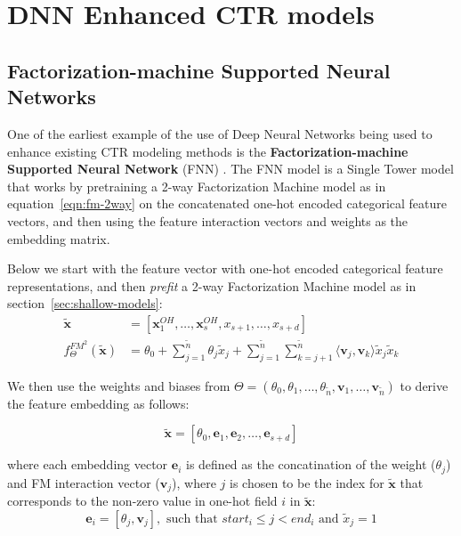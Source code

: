 \documentclass{mldsmsc}
\begin{document}
\section{DNN Enhanced CTR models}
\label{sec:mlp-enhanced-models}

\subsection{Factorization-machine Supported Neural Networks}

One of the earliest example of the use of Deep Neural Networks being used to enhance existing
CTR modeling methods is the \textbf{Factorization-machine Supported Neural Network} (FNN)
\citep{RefWorks:zhang2016deep}. The FNN model is a Single Tower model that works by pretraining
a 2-way Factorization Machine model as in equation~\ref{eqn:fm-2way} on the concatenated
one-hot encoded categorical feature vectors, and then using the feature interaction vectors and
weights as the embedding matrix.

Below we start with the feature vector with one-hot encoded categorical feature representations, and then \emph{prefit}
a 2-way Factorization Machine model as in section~\ref{sec:shallow-models}:
\begin{align*}
    \tilde{\mathbf{x}} &= \left[\mathbf{x}_1^{OH}, \ldots, \mathbf{x}_s^{OH},  x_{s+1}, \ldots, x_{s+d}\right]\\
    f_{\Theta}^{FM^2}(\tilde{\mathbf{x}} ) &= \theta_0 + \sum_{j=1}^{\tilde{n}} \theta_j \tilde{x}_j +
    \sum_{j=1}^{\tilde{n}} \sum_{k=j+1}^{\tilde{n}}
    \langle \mathbf{v}_j, \mathbf{v}_k \rangle \tilde{x}_j \tilde{x}_k
\end{align*}

We then use the weights and biases
from $\Theta = (\theta_0, \theta_1, \ldots , \theta_{\tilde{n}}, \mathbf{v}_1, \ldots, \mathbf{v}_{\tilde{n}})$ to
derive the feature embedding as follows:

\begin{equation*}
\tilde{\mathbf{x}} = \left[\theta_0, \mathbf{e}_1, \mathbf{e}_2, \ldots, \mathbf{e}_{s+d}\right]
\end{equation*}

where each embedding vector $\mathbf{e}_i$ is defined as the concatination of
the weight ($\theta_j$) and FM interaction vector ($\mathbf{v}_j$), where $j$ is chosen
to be the index for $\tilde{\mathbf{x}}$ that corresponds to the non-zero value in one-hot field
$i$ in $\tilde{\mathbf{x}}$:
\begin{equation*}
    \mathbf{e}_i = \left[\theta_j, \mathbf{v}_j\right], \text{ such that }start_i \leq j < end_i \text{ and } \tilde{x}_j =1 
\end{equation*}
\end{document}
